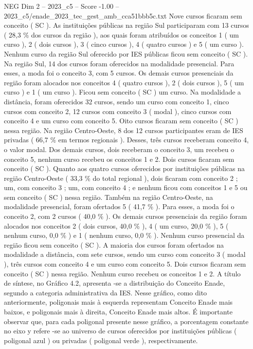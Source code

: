 \begin{textsample}{NEG Dim 2 – 2023\_c5 – Score -1.00 – 2023\_c5/enade\_2023\_tec\_gest\_amb\_cca51bbb5c.txt}
Nove cursos ficaram sem conceito ( SC ).
As instituições públicas na região Sul participaram com 13 cursos ( 28,3 \% dos cursos da região ), aos quais foram atribuídos os conceitos 1 ( um curso ), 2 ( dois cursos ), 3 ( cinco cursos ), 4 ( quatro cursos ) e 5 ( um curso ).
Nenhum curso da região Sul oferecido por IES públicas ficou sem conceito ( SC ).
Na região Sul, 14 dos cursos foram oferecidos na modalidade presencial.
Para esses, a moda foi o conceito 3, com 5 cursos.
Os demais cursos presenciais da região foram alocados nos conceitos 4 ( quatro cursos ), 2 ( dois cursos ), 5 ( um curso ) e 1 ( um curso ).
Ficou sem conceito ( SC ) um curso.
Na modalidade a distância, foram oferecidos 32 cursos, sendo um curso com conceito 1, cinco cursos com conceito 2, 12 cursos com conceito 3 ( modal ), cinco cursos com conceito 4 e um curso com conceito 5.
Oito cursos ficaram sem conceito ( SC ) nessa região.
Na região Centro-Oeste, 8 dos 12 cursos participantes eram de IES privadas ( 66,7 \% em termos regionais ).
Desses, três cursos receberam conceito 4, o valor modal.
Dos demais cursos, dois receberam o conceito 3, um recebeu o conceito 5, nenhum curso recebeu os conceitos 1 e 2.
Dois cursos ficaram sem conceito ( SC ).
Quanto aos quatro cursos oferecidos por instituições públicas na região Centro-Oeste ( 33,3 \% do total regional ), dois ficaram com conceito 2 ; um, com conceito 3 ; um, com conceito 4 ; e nenhum ficou com conceitos 1 e 5 ou sem conceito ( SC ) nessa região.
Também na região Centro-Oeste, na modalidade presencial, foram ofertados 5 ( 41,7 \% ).
Para esses, a moda foi o conceito 2, com 2 cursos ( 40,0 \% ).
Os demais cursos presenciais da região foram alocados nos conceitos 2 ( dois cursos, 40,0 \% ), 4 ( um curso, 20,0 \% ), 5 ( nenhum curso, 0,0 \% ) e 1 ( nenhum curso, 0,0 \% ).
Nenhum curso presencial da região ficou sem conceito ( SC ).
A maioria dos cursos foram ofertados na modalidade a distância, com sete cursos, sendo um curso com conceito 3 ( modal ), três cursos com conceito 4 e um curso com conceito 5.
Dois cursos ficaram sem conceito ( SC ) nessa região.
Nenhum curso recebeu os conceitos 1 e 2.
A título de síntese, no Gráfico 4.2, apresenta -se a distribuição do Conceito Enade, segundo a categoria administrativa da IES.
Nesse gráfico, como dito anteriormente, poligonais mais à esquerda representam Conceito Enade mais baixos, e poligonais mais à direita, Conceito Enade mais altos.
É importante observar que, para cada poligonal presente nesse gráfico, a porcentagem constante no eixo y refere -se ao universo de cursos oferecidos por instituições públicas ( poligonal azul ) ou privadas ( poligonal verde ), respectivamente.

\end{textsample}
